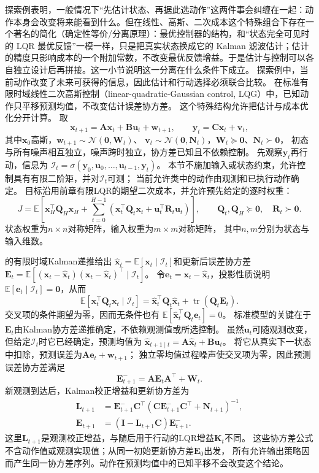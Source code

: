 探索例表明，一般情况下“先估计状态、再据此选动作”这两件事会纠缠在一起：动作本身会改变将来能看到什么。但在线性、高斯、二次成本这个特殊组合下存在一个著名的简化（确定性等价/分离原理）：最优控制器的结构，和“状态完全可见时的 LQR 最优反馈”一模一样，只是把真实状态换成它的 Kalman 滤波估计；估计的精度只影响成本的一个附加常数，不改变最优反馈增益。于是估计与控制可以各自独立设计后再拼接。这一小节说明这一分离在什么条件下成立。
探索例中，当前动作改变了未来可获得的信息，因此估计和行动选择必须联合比较。
在标准有限时域线性二次高斯控制（linear-quadratic-Gaussian control, LQG）中，已知动作只平移预测均值，不改变估计误差协方差。
这个特殊结构允许把估计与成本优化分开计算。
取
\[
  \bm x_{t+1}=\bm A\bm x_t+\bm B\bm u_t+\bm w_{t+1},
  \qquad \bm y_t=\bm C\bm x_t+\bm v_t,
\]
其中$\bm x_0$高斯，$\bm w_{t+1}\sim\mathcal N(\bm0,\bm W_t)$、
$\bm v_t\sim\mathcal N(\bm0,\bm N_t)$，$\bm W_t\succeq\bm0$、$\bm N_t\succ\bm0$，
初态与所有噪声相互独立，噪声跨时独立，协方差已知且不依赖控制。
先观察$\bm y_t$再行动，信息为
$\mathcal I_t=\sigma(\bm y_0,\bm u_0,\ldots,\bm u_{t-1},\bm y_t)$。
本节不施加输入或状态约束，允许控制具有有限二阶矩，并对$\mathcal I_t$可测；
当前允许类中的动作由观测和已执行动作确定。
目标沿用前章有限LQR的期望二次成本，并允许预先给定的逐时权重：
\[
  J=\mathbb E\left[\bm x_H^\top\bm Q_H\bm x_H
    +\sum_{t=0}^{H-1}
      (\bm x_t^\top\bm Q_t\bm x_t+\bm u_t^\top\bm R_t\bm u_t)\right],
  \qquad \bm Q_t,\bm Q_H\succeq\bm0,\quad\bm R_t\succ\bm0.
\]
状态权重为$n\times n$对称矩阵，输入权重为$m\times m$对称矩阵，
其中$n,m$分别为状态与输入维数。

的有限时域Kalman递推给出
$\widehat{\bm x}_t=\mathbb E[\bm x_t\mid\mathcal I_t]$和更新后误差协方差
$\bm E_t=\mathbb E[(\bm x_t-\widehat{\bm x}_t)
(\bm x_t-\widehat{\bm x}_t)^\top\mid\mathcal I_t]$。
令$\bm e_t=\bm x_t-\widehat{\bm x}_t$，投影性质说明
$\mathbb E[\bm e_t\mid\mathcal I_t]=\bm0$，从而
\[
  \mathbb E[\bm x_t^\top\bm Q_t\bm x_t\mid\mathcal I_t]
  =\widehat{\bm x}_t^\top\bm Q_t\widehat{\bm x}_t
    +\operatorname{tr}(\bm Q_t\bm E_t).
\]
交叉项的条件期望为零，因而无条件也有
$\mathbb E[\widehat{\bm x}_t^\top\bm Q_t\bm e_t]=0$。
标准模型的关键在于$\bm E_t$由Kalman协方差递推确定，不依赖观测值或所选控制。
虽然$\bm u_t$可随观测改变，但给定$\mathcal I_t$时它已经确定，预测均值为
$\widehat{\bm x}_{t+1\mid t}=\bm A\widehat{\bm x}_t+\bm B\bm u_t$。
将它从真实下一状态中扣除，预测误差为$\bm A\bm e_t+\bm w_{t+1}$；
独立零均值过程噪声使交叉项为零，因此预测误差协方差满足
\[
  \bm E_{t+1}^{-}=\bm A\bm E_t\bm A^\top+\bm W_t.
\]
新观测到达后，Kalman校正增益和更新协方差为
\begin{align*}
  \bm L_{t+1}
  &=\bm E_{t+1}^{-}\bm C^\top
    (\bm C\bm E_{t+1}^{-}\bm C^\top+\bm N_{t+1})^{-1},\\
  \bm E_{t+1}&=(\bm I-\bm L_{t+1}\bm C)\bm E_{t+1}^{-}.
\end{align*}
这里$\bm L_{t+1}$是观测校正增益，与随后用于行动的LQR增益$\bm K_t$不同。
这些协方差公式不含动作值或观测实现值；从同一初始更新协方差$\bm E_0$出发，
所有允许输出策略因而产生同一协方差序列。动作在预测均值中的已知平移不会改变这个结论。

